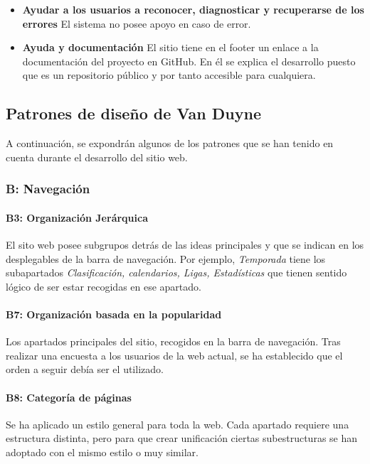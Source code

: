 \documentclass[10pt, spanish, pdftex]{template/UC3M_document}
\begin{document}
\begin{itemize}
    \item \textbf{Ayudar a los usuarios a reconocer, diagnosticar y recuperarse de los errores}
    El sistema no posee apoyo en caso de error.

    \item \textbf{Ayuda y documentación}
    El sitio tiene en el footer un enlace a la documentación del proyecto en GitHub. En él se explica el desarrollo puesto que es un repositorio público y por tanto accesible para cualquiera.
  \end{itemize}


\subsection{Patrones de diseño de Van Duyne}
A continuación, se expondrán algunos de los patrones que se han tenido en cuenta durante el desarrollo del sitio web.

\subsubsection{B: Navegación}
\paragraph{B3: Organización Jerárquica}
  El sito web posee subgrupos detrás de las ideas principales y que se indican en los desplegables de la barra de navegación. Por ejemplo, \textit{Temporada} tiene los subapartados \textit{Clasificación, calendarios, Ligas, Estadísticas} que tienen sentido lógico de ser estar recogidas en ese apartado.
\paragraph{B7: Organización basada en la popularidad}
  Los apartados principales del sitio, recogidos en la barra de navegación. Tras realizar una encuesta a los usuarios de la web actual, se ha establecido que el orden a seguir debía ser el utilizado.
\paragraph{B8: Categoría de páginas}
  Se ha aplicado un estilo general para toda la web. Cada apartado requiere una estructura distinta, pero para que crear unificación ciertas subestructuras se han adoptado con el mismo estilo o muy similar.
\end{document}
